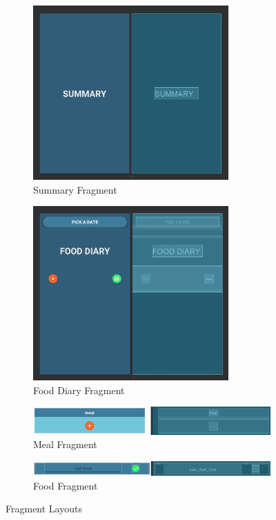 \documentclass{article}
\begin{document}
\begin{figure}[h]
\centering
\hspace*{-2cm}
\begin{subfigure}{.5\textwidth}
  \centering
  \includegraphics[width=7.5cm]{summary_fragment.png}
  \caption{Summary Fragment}
  \label{fig:summary_fragment_label}
\end{subfigure}%
\hspace*{2cm}
\begin{subfigure}{.5\textwidth}
  \centering
  \includegraphics[width=7.5cm]{food_diary_fragment.png}
  \caption{Food Diary Fragment}
  \label{fig:food_diary_fragment_label}
\end{subfigure}
\hspace*{-4cm}
\begin{subfigure}{\textwidth}
  \centering
  \includegraphics[width=16cm]{meal_fragment.png}
  \caption{Meal Fragment}
  \label{fig:meal_fragment_label}
\end{subfigure}
\hspace*{-4cm} 
\begin{subfigure}{\textwidth}
  \centering
  \includegraphics[width=16cm]{food_fragment.png}
  \caption{Food Fragment}
  \label{fig:food_fragment_label}
\end{subfigure}
\caption{Fragment Layouts}
\label{fig:fragment_layouts}
\end{figure}
\end{document}

